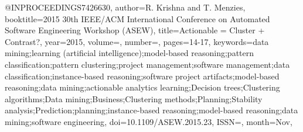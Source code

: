 @INPROCEEDINGS{7426630,
author={R. {Krishna} and T. {Menzies}},
booktitle={2015 30th IEEE/ACM International Conference on Automated Software Engineering Workshop (ASEW)},
title={Actionable = Cluster + Contrast?},
year={2015},
volume={},
number={},
pages={14-17},
keywords={data mining;learning (artificial intelligence);model-based reasoning;pattern classification;pattern clustering;project management;software management;data classification;instance-based reasoning;software project artifacts;model-based reasoning;data mining;actionable analytics learning;Decision trees;Clustering algorithms;Data mining;Business;Clustering methods;Planning;Stability analysis;Prediction;planning;instance-based reasoning;model-based reasoning;data mining;software engineering},
doi={10.1109/ASEW.2015.23},
ISSN={},
month={Nov},}